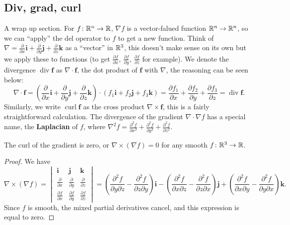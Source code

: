 \subsection{Div, grad, curl}
A wrap up section. For $f \colon \mathbb{R}^n  \to \mathbb{R}$, $\nabla f$ is a vector-falued function $\mathbb{R}^n \to \mathbb{R}^n $, so we can ``apply'' the del operator to $f$ to get a new function. Think of $\nabla= \frac{\partial }{\partial x}\mathbf i+\frac{\partial }{\partial y}\mathbf j+\frac{\partial }{\partial z}\mathbf k$ as a ``vector'' in $\mathbb{R}^3$, this doesn't make sense on its own but we apply these to functions (to get $\frac{\partial f}{\partial x},\ \frac{\partial f}{\partial y},\ \frac{\partial f}{\partial z}$ for example). We denote the divergence $\operatorname{div}\mathbf f$ as $\nabla\cdot \mathbf f$, the dot product of $\mathbf f$ with $\nabla$, the reasoning can be seen below: \[
\nabla \cdot \mathbf f=\left( \frac{\partial }{\partial x}\mathbf i+\frac{\partial }{\partial y}\mathbf j+\frac{\partial }{\partial z}\mathbf k \right) \cdot (f_1 \mathbf i+f_2\mathbf j+f_3\mathbf k)=\frac{\partial f_1}{\partial x}+\frac{\partial f_2}{\partial y}+\frac{\partial f_3}{\partial z}=\operatorname{div}\mathbf f.
\] Similarly, we write $\operatorname{curl}\mathbf f$ as the cross product $\nabla \times \mathbf f$, this is a fairly straightforward calculation. The divergence of the gradient $\nabla\cdot \nabla f$ has a special name, the \textbf{Laplacian} of $f$, where $\nabla^2f=\frac{\partial ^2f}{\partial x^2}+\frac{\partial ^2f}{\partial y^2}+\frac{\partial ^2f}{\partial z^2}$.
\begin{theorem}
    The curl of the gradient is zero, or $\nabla\times (\nabla f)=0$ for any smooth $f \colon \mathbb{R}^3 \to \mathbb{R}$.
\end{theorem}
\begin{proof}
   We have 
   \[
   \nabla \times (\nabla f)=\begin{vmatrix}
       \mathbf i & \mathbf j & \mathbf k \\
       \frac{\partial }{\partial x} & \frac{\partial }{\partial y}& \frac{\partial }{\partial z}\\
       \frac{\partial f}{\partial x}& \frac{\partial f}{\partial y}& \frac{\partial f}{\partial z}
   \end{vmatrix}=\left( \frac{\partial ^2f}{\partial y\partial z}-\frac{\partial ^2f}{\partial z\partial y} \right) \mathbf i - \left( \frac{\partial ^2f}{\partial x\partial z}-\frac{\partial ^2f}{\partial z\partial x} \right) \mathbf j+ \left( \frac{\partial ^2f}{\partial x\partial y}-\frac{\partial ^2f}{\partial y\partial x} \right) \mathbf k.
   \] Since $f$ is smooth, the mixed partial derivatives cancel, and this expression is equal to zero.
\end{proof}
